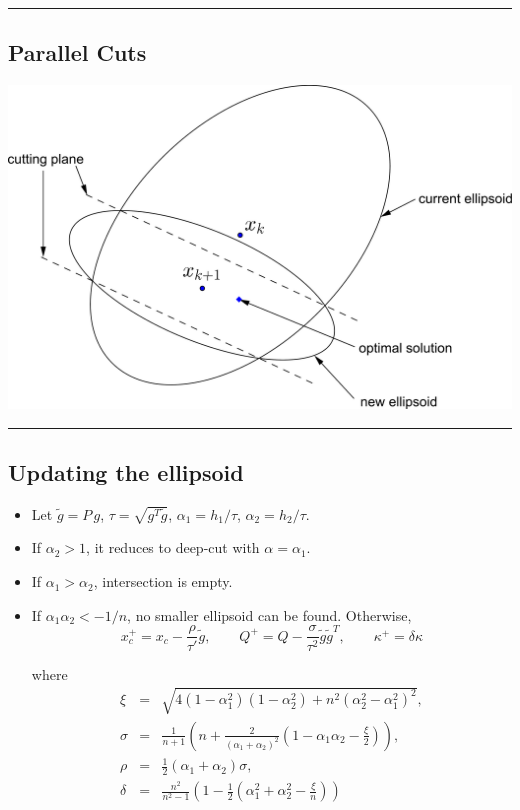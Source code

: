 \documentclass[]{article}
\begin{document}
\begin{center}\rule{0.5\linewidth}{\linethickness}\end{center}

\hypertarget{parallel-cuts-1}{%
\subsection{Parallel Cuts}\label{parallel-cuts-1}}

\includegraphics{ellipsoid.files/parallel_cut.pdf}

\begin{center}\rule{0.5\linewidth}{\linethickness}\end{center}

\hypertarget{updating-the-ellipsoid}{%
\subsection{Updating the ellipsoid}\label{updating-the-ellipsoid}}

\begin{itemize}
\item
  Let \(\tilde{g} = P\,g\), \(\tau = \sqrt{g^T\tilde{g}}\),
  \(\alpha_1 = h_1/\tau\), \(\alpha_2 = h_2/\tau\).
\item
  If \(\alpha_2 > 1\), it reduces to deep-cut with
  \(\alpha = \alpha_1\).
\item
  If \(\alpha_1 > \alpha_2\), intersection is empty.
\item
  If \(\alpha_1 \alpha_2 < -1/n\), no smaller ellipsoid can be found.
  Otherwise, \[x_c^+ = x_c - \frac{\rho}{\tau'} \tilde{g}, \qquad
  Q^+ = Q - \frac{\sigma}{\tau^2} \tilde{g}\tilde{g}^T, \qquad
  \kappa^+ =  \delta \kappa
   \]

  where \[\begin{array}{lll}
    \xi &=& \sqrt{4(1 - \alpha_1^2)(1 - \alpha_2^2) + n^2(\alpha_2^2 - \alpha_1^2)^2}, \\
    \sigma &=& \frac{1}{n+1}(n + \frac{2}{(\alpha_1 + \alpha_2)^2}(1 - \alpha_1\alpha_2 - \frac{\xi}{2})), \\
    \rho &=& \frac{1}{2}(\alpha_1 + \alpha_2) \sigma, \\
    \delta &=& \frac{n^2}{n^2-1} (1 - \frac{1}{2}(\alpha_1^2 + \alpha_2^2 - \frac{\xi}{n}))
   \end{array}\]
\end{itemize}
\end{document}
